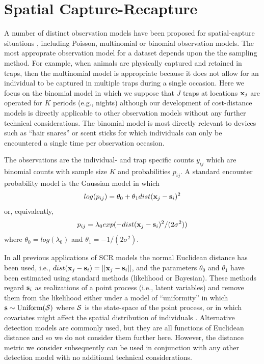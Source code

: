 \documentclass[12pt]{article}
\begin{document}
\section{Spatial Capture-Recapture}

A number of distinct observation models have been proposed for
spatial-capture situations \citep{borchers_efford:2008,
  royle_etal:2009ecol, efford_etal:2009ecol}, including Poisson, multinomial or binomial
observation models. The most
approprate observation model for a dataset depends upon the the
sampling method.
For example, when animals are physically captured and retained
in traps, then the multinomial model is appropriate because it does not
allow for an individual to be captured in multiple traps during a
single occasion. Here we focus on the binomial model in which we
suppose that $J$ traps at locations ${\bf x}_{j}$ are operated for $K$
periods (e.g., nights) although our development of cost-distance
models is directly applicable to other observation models without any
further technical considerations. The binomial model is most directly
relevant to devices such as ``hair snares''
\citep{woods_etal:1999,gardner_etal:2010} or scent sticks
\citep{kery_etal:2010} for which individuals can only be encountered a
single time per observation occasion.

The observations are the individual- and trap specific counts $y_{ij}$
which are binomial counts with sample size $K$ and probabilities
$p_{ij}$. A standard encounter probability model
\citep{borchers_efford:2008} is the Gaussian model in which
\begin{equation}
log(p_{ij})= \theta_{0} + \theta_{1} dist({\bf x}_{j} - {\bf s}_{i})^{2}
\label{eq.encounter}
\end{equation}
or, equivalently,
\[
p_{ij} = \lambda_{0} exp(-  dist({\bf x}_{j} - {\bf s}_{i})^{2}
/(2\sigma^{2}) )
\]
where $\theta_{0} = log(\lambda_{0})$ and $\theta_{1} =
-1/(2\sigma^2)$.

In all previous applications of SCR models the normal Euclidean
distance has been used, i.e., $ dist({\bf x}_{j} - {\bf s}_{i}) =
||{\bf x}_{j} - {\bf s}_{i}||$, and the parameters $\theta_0$ and
$\theta_1$ have been estimated using standard methods (likelihood or
Bayesian). These methods regard ${\bf s}_{i}$ as realizations of a
point process (i.e., latent variables) and remove them from the
likelihood either under a model of ``uniformity'' in which ${\bf s}
\sim \mbox{Uniform}({\cal S})$ where ${\cal S}$ is the state-space of
the point process, or in which covariates might affect the spatial
distribution of individuals \citep{borchers_efford:2008}. Alternative detection
models are commonly used, but they are all functions of Euclidean
distance and so we do not consider them further here. However, the
distance metric we consider subsequently can be used in conjunction
with any other detection model with no additional technical
considerations.
\end{document}
